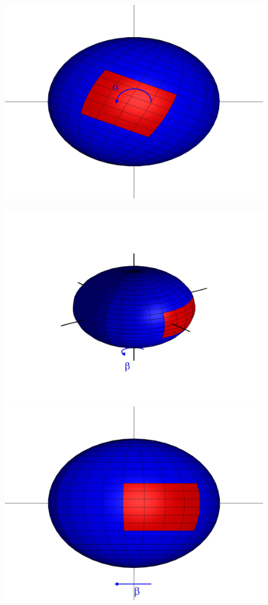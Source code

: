 \documentclass{pnastwo}
\begin{document}
\begin{figure}
\begin{minipage}{0.2\textwidth}
\includegraphics[width=\textwidth]{sphere2_2}\\
\end{minipage}
\begin{minipage}{0.2\textwidth}
\centering
\includegraphics[width=\textwidth]{sphere_3}\\
\includegraphics[width=\textwidth]{sphere2_3}\\

\end{minipage}
\end{figure}
\end{document}
